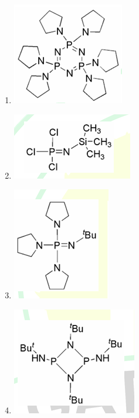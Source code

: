 \documentclass[journal,12pt,onecolumn]{IEEEtran}
\theoremstyle{remark}
\begin{document}
\begin{enumerate}
\begin{multicols}{2}
    \begin{enumerate}
        \item \includegraphics[width=0.3\columnwidth]{figs/q11a.png}
        \item \includegraphics[width=0.3\columnwidth]{figs/q11b.png}
        \item \includegraphics[width=0.3\columnwidth]{figs/q11c.png}
        \item \includegraphics[width=0.3\columnwidth]{figs/q11d.png}
    \end{enumerate}      \hfill{}
    \end{multicols}




\end{enumerate}
\end{document}
